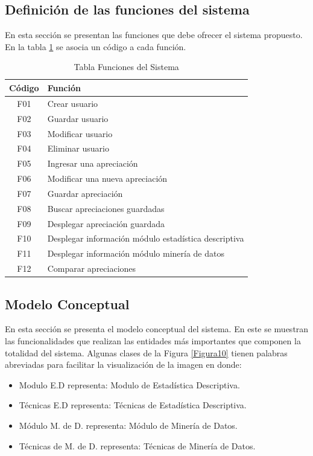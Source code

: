 \subsection{Definición de las funciones del sistema}

En esta sección se presentan las funciones que debe ofrecer el sistema propuesto. En la tabla \ref{tablafunc} se asocia un código a cada función.

\begin{table}[h]
\centering
\label{tablafunc}
\begin{tabular}{|c|l|}
	\hline \textbf{Código} & \textbf{Función} \\
	\hline F01 & Crear usuario \\ 
	\hline F02 & Guardar usuario  \\
	\hline F03 & Modificar usuario \\ 
	\hline F04 & Eliminar usuario \\ 
	\hline F05 & Ingresar una apreciación  \\
	\hline F06 & Modificar una nueva apreciación  \\
	\hline F07 & Guardar apreciación \\
	\hline F08 & Buscar apreciaciones guardadas \\
	\hline F09 & Desplegar apreciación guardada\\
	\hline F10 & Desplegar información módulo estadística descriptiva \\ 
	\hline F11 & Desplegar información módulo minería de datos  \\ 
	\hline F12 & Comparar apreciaciones\\
	\hline 
\end{tabular} 
\caption{Tabla Funciones del Sistema}
\end{table}

\subsection{Modelo Conceptual}

En esta sección se presenta el modelo conceptual del sistema. En este se muestran las funcionalidades que realizan las entidades más importantes que componen la totalidad del sistema.
Algunas clases de la Figura \ref{Figura10} tienen palabras abreviadas para facilitar la visualización de la imagen en donde:\\

\begin{itemize}
	\item Modulo E.D representa: Modulo de Estadística Descriptiva.
	
	\item Técnicas E.D representa: Técnicas de Estadística Descriptiva.
	
	\item Módulo M. de D. representa: Módulo de Minería de Datos.
	
	\item Técnicas de M. de D. representa: Técnicas de Minería de Datos. 
\end{itemize}

